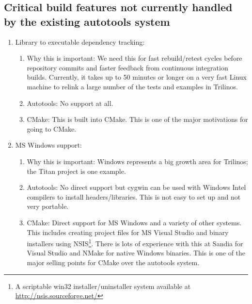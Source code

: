 \documentclass[pdf,ps2pdf,11pt]{SANDreport}
\begin{document}
%
{}\subsection{Critical build features not currently handled by the
existing autotools system}
%

\begin{enumerate}

{}\item Library to executable dependency tracking:

  \begin{enumerate}

  {}\item Why this is important: We need this for fast rebuild/retest
  cycles before repository commits and faster feedback from continuous
  integration builds.  Currently, it takes up to 50 minutes or longer
  on a very fast Linux machine to relink a large number of the tests
  and examples in Trilinos.

  {}\item Autotools: No support at all.

  {}\item CMake: This is built into CMake.  This is one of the major
  motivations for going to CMake.

  \end{enumerate}

{}\item MS Windows support:

  \begin{enumerate}

  {}\item Why this is important: Windows represents a big growth area
  for Trilinos; the Titan project is one example.

  {}\item Autotools: No direct support but cygwin can be used with
  Windows Intel compilers to install headers/libraries.  This is not
  easy to set up and not very portable.

  {}\item CMake: Direct support for MS Windows and a variety of other
  systems.  This includes creating project files for MS Visual Studio
  and binary installers using NSIS\footnote{A scriptable win32
  installer/uninstaller system available at
  \url{http://nsis.sourceforge.net/}}.  There is lots of experience
  with this at Sandia for Visual Studio and NMake for native Windows
  binaries.  This is one of the major selling points for CMake over
  the autotools system.


\end{enumerate}
\end{enumerate}
\end{document}
